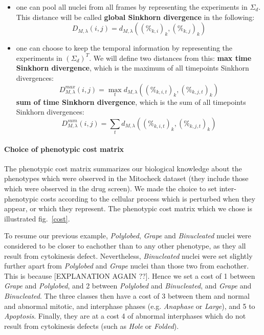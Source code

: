 \begin{itemize}
\item one can pool all nuclei from all frames by representing the experiments in $\Sigma_d$. This distance will be called \textbf{global Sinkhorn divergence} in the following:
\begin{equation}
D_{M,\lambda}(i,j)= d_{M,\lambda}((\%_{k,i})_{k},(\%_{k,j})_{k})
\label{global}
\end{equation}
\item one can choose to keep the temporal information by representing the experiments in $\left(\Sigma_d\right) ^T$. We will define two distances from this:
\subitem \textbf{max time Sinkhorn divergence}, which is the maximum of all timepoints Sinkhorn divergences:
\begin{equation}
D_{M,\lambda}^{max}(i,j)= \max_t d_{M,\lambda}((\%_{k,i,t})_{k},(\%_{k,j,t})_{k})
\label{max}
\end{equation}
\subitem \textbf{sum of time Sinkhorn divergence}, which is the sum of all timepoints Sinkhorn divergences: 
\begin{equation}
D_{M,\lambda}^{sum}(i,j)= \sum_t d_{M,\lambda}((\%_{k,i,t})_{k},(\%_{k,j,t})_{k})
\label{int}
\end{equation}
\end{itemize}

\paragraph{Choice of phenotypic cost matrix}
The phenotypic cost matrix summarizes our biological knowledge about the phenotypes which were observed in the Mitocheck dataset (they include those which were observed in the drug screen). We made the choice to set inter-phenotypic costs according to the cellular process which is perturbed when they appear, or which they represent. The phenotypic cost matrix which we chose is illustrated fig.~\ref{cost}.

To resume our previous example, \textit{Polylobed}, \textit{Grape} and \textit{Binucleated} nuclei were considered to be closer to eachother than to any other phenotype, as they all result from cytokinesis defect. Nevertheless, \textit{Binucleated} nuclei were set slightly further apart from \textit{Polylobed} and \textit{Grape} nuclei than those two from eachother. This is because [EXPLANATION AGAIN ??]. Hence we set a cost of 1 between \textit{Grape} and \textit{Polylobed}, and 2 between \textit{Polylobed} and \textit{Binucleated}, and \textit{Grape} and \textit{Binucleated}. The three classes then have a cost of 3 between them and normal and abnormal mitotic, and interphase phases (e.g. \textit{Anaphase} or \textit{Large}), and 5 to \textit{Apoptosis}. Finally, they are at a cost 4 of abnormal interphases which do not result from cytokinesis defects (such as \textit{Hole} or \textit{Folded}).

